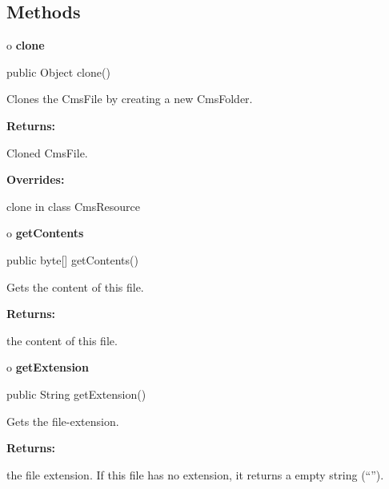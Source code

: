 \subsection*{  Methods }

o {\bf clone} 

\begin{PRE}
 public Object clone()
\end{PRE}

\begin{description}
\htmlDD Clones the CmsFile by creating a new CmsFolder. 

\begin{description}
\item {\bf Returns:}  

Cloned CmsFile.  
\item {\bf Overrides:}  

clone in class CmsResource  
\end{description}

\end{description}

o {\bf getContents} 

\begin{PRE}
 public byte[] getContents()
\end{PRE}

\begin{description}
\htmlDD Gets the content of this file. 

\begin{description}
\item {\bf Returns:}  

the content of this file.  
\end{description}

\end{description}

o {\bf getExtension} 

\begin{PRE}
 public String getExtension()
\end{PRE}

\begin{description}
\htmlDD Gets the file-extension. 

\begin{description}
\item {\bf Returns:}  

the file extension. If this file has no extension, it returns a empty string
(``'').  
\end{description}

\end{description}


